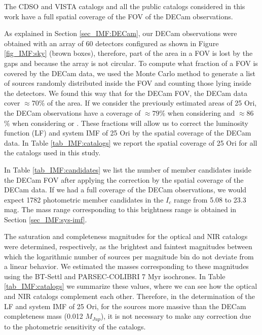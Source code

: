 \documentclass[12pt]{article}
\newcounter{subsubsubsection}[subsubsection]
\begin{document}
\label{sec_IMF:spatial}
The CDSO and VISTA catalogs and all the public catalogs considered in this work have a full spatial coverage of the FOV of the DECam observations.

As explained in Section \ref{sec_IMF:DECam}, our DECam observations were obtained with an array of 60 detectors configured as shown in Figure \ref{fig_IMF:sky} (brown boxes), therefore, part of the area in a FOV is lost by the gaps and because the array is not circular. To compute what fraction of a FOV is covered by the DECam data, we used the Monte Carlo method to generate a list of sources randomly distributed inside the FOV and counting those lying inside the detectors. We found this way that for the DECam FOV, the DECam data cover $\approx70$\% of the area. If we consider the previously estimated areas of 25 Ori, the DECam observations have a coverage of $\approx 79$\% when considering \citet[1.0$^\circ$ radius; ][]{Briceno2005,Briceno2007} and $\approx86$\% when considering \citet[0.7$^\circ$ radius; ][]{Briceno2018} or \citet[0.5$^\circ$ radius; ][]{Downes2014}. These fractions will allow us to correct the luminosity function (LF) and system IMF of 25 Ori by the spatial coverage of the DECam data. In Table \ref{tab_IMF:catalogs} we report the spatial coverage of 25 Ori for all the catalogs used in this study.

In Table \ref{tab_IMF:candidates} we list the number of member candidates inside the DECam FOV after applying the correction by the spatial coverage of the DECam data. If we had a full coverage of the DECam observations, we would expect 1782 photometric member candidates in the $I_c$ range from 5.08 to 23.3 mag. The mass range corresponding to this brightness range is obtained in Section \ref{sec_IMF:sys-imf}.

\label{sec_IMF:sensitivity}
The saturation and completeness magnitudes for the optical and NIR catalogs were determined, respectively, as the brightest and faintest magnitudes between which the logarithmic number of sources per magnitude bin do not deviate from a linear behavior. We estimated the masses corresponding to these magnitudes using the BT-Settl and PARSEC-COLIBRI 7 Myr isochrones. In Table \ref{tab_IMF:catalogs} we summarize these values, where we can see how the optical and NIR catalogs complement each other. Therefore, in the determination of the LF and system IMF of 25 Ori, for the sources more massive than the DECam completeness mass (0.012 $M_{Jup}$), it is not necessary to make any correction due to the photometric sensitivity of the catalogs.
\end{document}
